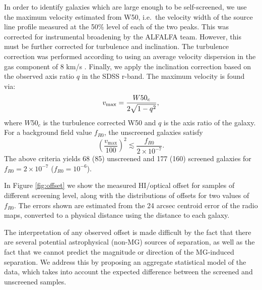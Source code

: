 \documentclass[twocolappendix, numberedappendix]{emulateapj}
\begin{document}
In order to identify galaxies which are large enough to be self-screened,
we use the maximum velocity estimated from W50, i.e.\ the
velocity width of the source
line profile measured at the 50\% level of each of the two peaks. This was
corrected for instrumental broadening by the ALFALFA team. However, this must
be further corrected for turbulence and inclination.
The turbulence correction was performed according to \citet{tully85} using an
average velocity dispersion in the gas component of 8 km/s \citep{begum06,
geha06}. Finally, we apply the inclination correction based on the observed
axis ratio $q$ in the SDSS r-band. The maximum velocity is found via:
\begin{equation}
  v_{\rm max} = \frac{W50_c}{2 \sqrt{1 - q^2}},
\end{equation}
where $W50_c$ is the turbulence corrected W50 and $q$ is the axis ratio of
the galaxy. For a background field value $f_{R0}$, the unscreened galaxies
satisfy  \citep[see][]{jainvinu2012}
\begin{equation}
  \left(\frac{v_{\mathrm{max}}}{100}\right)^2 \lesssim
  \frac{f_{R0}}{2\times10^{-7}}.
\label{eq:unscreened}
\end{equation}
The above criteria yields 68 (85) unscreened and 177 (160) screened galaxies
for $f_{R0} = 2 \times10^{-7}$ ($f_{R0} = 10^{-6}$).

In Figure \ref{fig:offset} we show the measured HI/optical
offset for samples of different screening level, along with the
distributions of offsets for two values of $f_{R0}$.
The errors shown are estimated from the 24 arcsec centroid 
error of the radio maps, converted to a physical distance using the
distance to each galaxy.

The interpretation of any observed offset
is made difficult by the fact that there are several potential
astrophysical (non-MG) sources of separation, as well as the fact that we
cannot predict the magnitude or direction of the MG-induced separation.
We address this by proposing an aggregate statistical model of the data,
which takes into account the expected difference between the screened and
unscreened samples.
\end{document}

